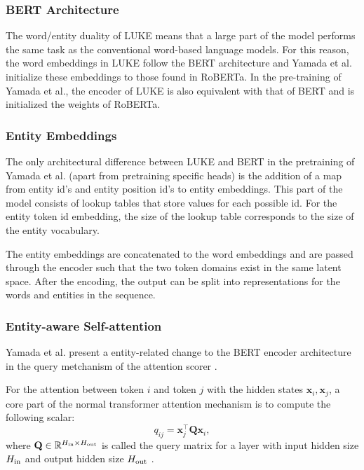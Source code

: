 \documentclass[main.tex]{subfiles}
\begin{document}
\subsubsection{BERT Architecture}
The word/entity duality of LUKE means that a large part of the model performs the same task as the conventional word-based language models.
For this reason, the word embeddings in LUKE follow the BERT architecture and Yamada et al. initialize these embeddings to those found in RoBERTa.
In the pre-training of Yamada et al., the encoder of LUKE is also equivalent with that of BERT and is initialized the weights of RoBERTa.

\subsubsection{Entity Embeddings}
The only architectural difference between LUKE and BERT in the pretraining of Yamada et al. (apart from pretraining specific heads) is the addition of a map from entity id's and entity position id's to entity embeddings.
This part of the model consists of lookup tables that store values for each possible id.
For the entity token id embedding, the size of the lookup table corresponds to the size of the entity vocabulary.

The entity embeddings are concatenated to the word embeddings and are passed through the encoder such that the two token domains exist in the same latent space.
After the encoding, the output can be split into representations for the words and entities in the sequence.


\subsubsection{Entity-aware Self-attention}
\label{subsubsec:entityaware}
Yamada et al. present a entity-related change to the BERT encoder architecture in the query metchanism of the attention scorer \cite[Sec. 3.2]{yamada2020luke}.

For the attention between token $i$ and token $j$ with the hidden states $\mathbf x_i, \mathbf x_j$, a core part of the normal transformer attention mechanism is to compute the following scalar:
\begin{equation}
    q_{ij} = \mathbf x_j^\top \mathbf Q \mathbf x_i,
\end{equation}
where $\mathbf Q\in \mathbb R^{H_\textup{in}\times H_\textup{out}}$ is called the query matrix for a layer with input hidden size $H_\textup{in}$ and output hidden size $H_\textup{out}$ \cite[Sec. 3.2.1]{vaswani2017att}.
\end{document}
